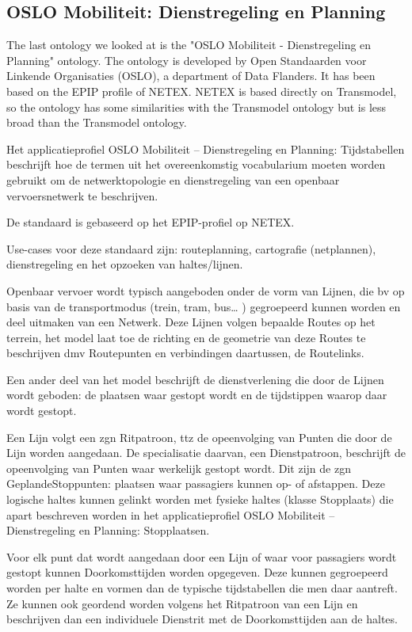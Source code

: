 \subsection{OSLO Mobiliteit: Dienstregeling en Planning}
The last ontology we looked at is the "OSLO Mobiliteit - Dienstregeling en Planning" \cite{noauthor_oslo_2023} ontology. The ontology is developed by Open Standaarden voor Linkende Organisaties (OSLO), a department of Data Flanders. It has been based on the EPIP profile of NETEX. NETEX is based directly on  Transmodel, so the ontology has some similarities with the Transmodel ontology but is less broad than the Transmodel ontology.

 Het applicatieprofiel OSLO Mobiliteit – Dienstregeling en Planning: Tijdstabellen beschrijft hoe de termen uit het overeenkomstig vocabularium moeten worden gebruikt om de netwerktopologie en dienstregeling van een openbaar vervoersnetwerk te beschrijven.

De standaard is gebaseerd op het EPIP-profiel op NETEX.

Use-cases voor deze standaard zijn: routeplanning, cartografie (netplannen), dienstregeling en het opzoeken van haltes/lijnen.

Openbaar vervoer wordt typisch aangeboden onder de vorm van Lijnen, die bv op basis van de transportmodus (trein, tram, bus… ) gegroepeerd kunnen worden en deel uitmaken van een Netwerk. Deze Lijnen volgen bepaalde Routes op het terrein, het model laat toe de richting en de geometrie van deze Routes te beschrijven dmv Routepunten en verbindingen daartussen, de Routelinks.

Een ander deel van het model beschrijft de dienstverlening die door de Lijnen wordt geboden: de plaatsen waar gestopt wordt en de tijdstippen waarop daar wordt gestopt.

Een Lijn volgt een zgn Ritpatroon, ttz de opeenvolging van Punten die door de Lijn worden aangedaan. De specialisatie daarvan, een Dienstpatroon, beschrijft de opeenvolging van Punten waar werkelijk gestopt wordt. Dit zijn de zgn GeplandeStoppunten: plaatsen waar passagiers kunnen op- of afstappen. Deze logische haltes kunnen gelinkt worden met fysieke haltes (klasse Stopplaats) die apart beschreven worden in het applicatieprofiel OSLO Mobiliteit – Dienstregeling en Planning: Stopplaatsen.

Voor elk punt dat wordt aangedaan door een Lijn of waar voor passagiers wordt gestopt kunnen Doorkomsttijden worden opgegeven. Deze kunnen gegroepeerd worden per halte en vormen dan de typische tijdstabellen die men daar aantreft. Ze kunnen ook geordend worden volgens het Ritpatroon van een Lijn en beschrijven dan een individuele Dienstrit met de Doorkomsttijden aan de haltes.


